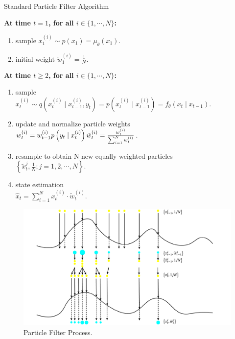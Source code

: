 \documentclass[mstat,12pt]{unswthesis}  %
\numberwithin{equation}{section}
\begin{document}
\begin{algorithm}[H]
\caption{\small Standard Particle Filter Algorithm} 
\textbf{At time $t=1$, for all $i \in\{1, \cdots, N\}$:} 
\begin{enumerate} 
\item sample $x_{1}^{(i)} \sim p\left(x_{1} \right)=\mu_{\theta}\left(x_{1}\right)$.
\item initial weight $\tilde{w}_{1}^{(i)}=\frac{1}{N}$.
\end{enumerate}

\textbf{At time $t\geq 2$, for all $i \in\{1, \cdots, N\}$:}
\begin{enumerate} 
 \item   sample\\
 $x_{t}^{(i)} \sim q\left( x_{t}^{(i)} \mid x_{t-1}^{(i)},y_{t}\right)
 =p\left( x_{t}^{(i)} \mid x_{t-1}^{(i)}\right)=f_{\theta}\left(x_{t} \mid x_{t-1}\right)$.
 \item update and normalize particle weights\\
 $w_{t}^{(i)} =
 w_{t-1}^{(i)}   p\left(y_{t} \mid x_{t}^{(i)}\right)\\
 \tilde{w}_{t}^{(i)}=\frac{w_{t}^{(i)}} {\sum_{i=1}^{N} w_{t}^{(i)}}$.
 \item resample to obtain N new equally-weighted particles\\
 $\left\{\tilde{x}_{t}^{j}, \frac{1}{N} ; j=1,2, \cdots, N\right\}$.
 \item state estimation\\
 $\hat{x}_{t}=\sum_{i=1}^{N} x_{t}^{(i)} \cdot \tilde{w}_{t}^{(i)}$.
\end{enumerate} 
\end{algorithm}



\begin{figure}[H]
    \centering
    \includegraphics[width=1.0\linewidth]{PF_figure.pdf}
    \caption{Particle Filter Process.}
    \label{fig:pf}
\end{figure}
\end{document}
